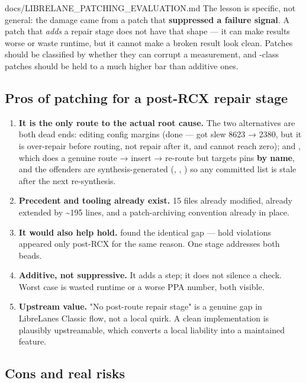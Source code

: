 \begin{relocated}{docs/LIBRELANE_PATCHING_EVALUATION.md}
The lesson is specific, not general: the damage came from a patch that
\textbf{suppressed a failure signal}. A patch that \emph{adds} a repair
stage does not have that shape --- it can make results worse or waste
runtime, but it cannot make a broken result look clean. Patches should
be classified by whether they can corrupt a measurement, and
-class patches should be held to a much higher bar than
additive ones.

\subsection{Pros of patching for a post-RCX repair stage}\label{tm:pd:librelane-patching:pros-of-patching-for-a-post-rcx-repair-stage}

\begin{enumerate}
\def\labelenumi{\arabic{enumi}.}
\tightlist
\item
  \textbf{It is the only route to the actual root cause.} The two
  alternatives are both dead ends: editing config margins (done ---
   got slew 8623 → 2380, but it is over-repair before
  routing, not repair after it, and cannot reach zero); and
  , which does a genuine route → insert →
  re-route but targets pins \textbf{by name}, and the offenders are
  synthesis-generated (, , )
  so any committed list is stale after the next re-synthesis.
\item
  \textbf{Precedent and tooling already exist.} 15 files already
  modified,  already extended by \textasciitilde195
  lines, and a patch-archiving convention already in place.
\item
  \textbf{It would also help hold.}  found the identical gap
  --- hold violations appeared only post-RCX for the same reason. One
  stage addresses both beads.
\item
  \textbf{Additive, not suppressive.} It adds a step; it does not
  silence a check. Worst case is wasted runtime or a worse PPA number,
  both visible.
\item
  \textbf{Upstream value.} "No post-route repair stage" is a genuine gap
  in LibreLane\textquotesingle s Classic flow, not a local quirk. A
  clean implementation is plausibly upstreamable, which converts a local
  liability into a maintained feature.
\end{enumerate}

\subsection{Cons and real risks}\label{tm:pd:librelane-patching:cons-and-real-risks}


\end{relocated}
